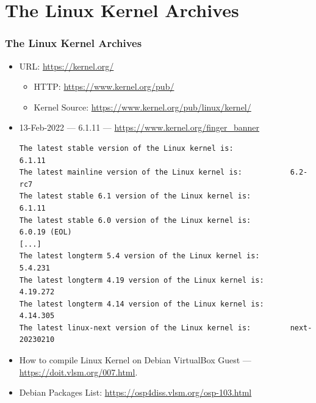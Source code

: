 \documentclass[aspectratio=169, xcolor=table, notheorems, hyperref={pdfpagelabels=false}]{beamer}
\begin{document}
\section{The Linux Kernel Archives}
\begin{frame}[fragile]
\frametitle{The Linux Kernel Archives}
\begin{itemize}
\item URL: \url{https://kernel.org/}
\begin{itemize}
\item HTTP: \url{https://www.kernel.org/pub/}
\item Kernel Source: \url{https://www.kernel.org/pub/linux/kernel/}
\end{itemize}
\item 13-Feb-2022 --- 6.1.11 --- \url{https://www.kernel.org/finger_banner}
\begin{lstlisting}[basicstyle=\ttfamily\small]
The latest stable version of the Linux kernel is:             6.1.11
The latest mainline version of the Linux kernel is:           6.2-rc7
The latest stable 6.1 version of the Linux kernel is:         6.1.11
The latest stable 6.0 version of the Linux kernel is:         6.0.19 (EOL)
[...]
The latest longterm 5.4 version of the Linux kernel is:       5.4.231
The latest longterm 4.19 version of the Linux kernel is:      4.19.272
The latest longterm 4.14 version of the Linux kernel is:      4.14.305
The latest linux-next version of the Linux kernel is:         next-20230210
\end{lstlisting}
\item How to compile Linux Kernel on Debian VirtualBox Guest --- \url{https://doit.vlsm.org/007.html}.
\item Debian Packages List: \url{https://osp4diss.vlsm.org/osp-103.html}
\end{itemize}
\end{frame}

\end{document}
